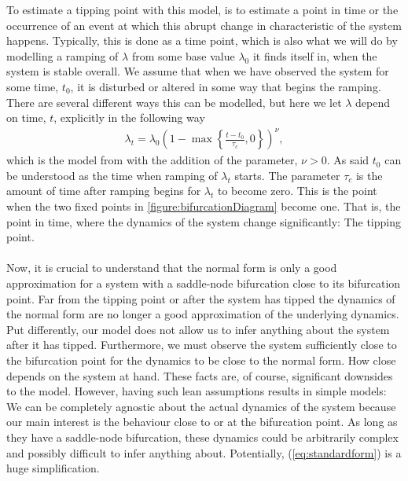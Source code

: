 To estimate a tipping point with this model, is to estimate a point in time or the occurrence of an event at which this abrupt change in characteristic of the system happens. Typically, this is done as a time point, which is also what we will do by modelling a ramping of $\lambda$ from some base value $\lambda_0$ it finds itself in, when the system is stable overall. We assume that when we have observed the system for some time, $t_0$, it is disturbed or altered in some way that begins the ramping. There are several different ways this can be modelled, but here we let $\lambda$ depend on time, $t$, explicitly in the following way
\begin{align}
    \lambda_t = \lambda_0\left(1 - \max\left\{\frac{t - t_0}{\tau_c},0\right\}\right)^\nu, \label{eq:lambdaRampDefinition}
\end{align} 
which is the model from \cite[equation (2)]{Ditlevsen2023} with the addition of the parameter, $\nu>0$. As said $t_0$ can be understood as the time when ramping of $\lambda_t$ starts. The parameter $\tau_c$ is the amount of time after ramping begins for $\lambda_t$ to become zero. This is the point when the two fixed points in \ref{figure:bifurcationDiagram} become one. That is, the point in time, where the dynamics of the system change significantly: The tipping point. \\\\
Now, it is crucial to understand that the normal form is only a good approximation for a system with a saddle-node bifurcation close to its bifurcation point. Far from the tipping point or after the system has tipped the dynamics of the normal form are no longer a good approximation of the underlying dynamics. Put differently, our model does not allow us to infer anything about the system after it has tipped. Furthermore, we must observe the system sufficiently close to the bifurcation point for the dynamics to be close to the normal form. How close depends on the system at hand. These facts are, of course, significant downsides to the model. However, having such lean assumptions results in simple models: We can be completely agnostic about the actual dynamics of the system because our main interest is the behaviour close to or at the bifurcation point. As long as they have a saddle-node bifurcation, these dynamics could be arbitrarily complex and possibly difficult to infer anything about. Potentially, (\ref{eq:standardform}) is a huge simplification.
